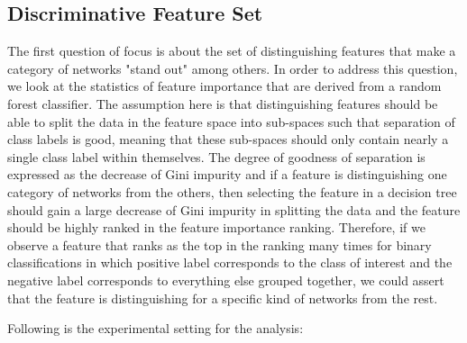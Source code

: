 \documentclass[..]{revtex4}
\begin{document}
\subsection{Discriminative Feature Set}
The first question of focus is about the set of distinguishing features that make a category of networks "stand out" among others. In order to address this question, we look at the 
 statistics of feature importance that are derived from a random forest classifier. The assumption here is that distinguishing features should be able to split the data in the feature space into sub-spaces such that separation of class labels is good, meaning that these sub-spaces should only contain nearly a single class label within themselves. The degree of goodness of separation is expressed as the decrease of Gini impurity and if a feature is distinguishing one category of networks from the others, then selecting the feature in a decision tree should gain a large decrease of Gini impurity in splitting the data and the feature should be highly ranked in the feature importance ranking. Therefore, if we observe a feature that ranks as the top in the ranking many times for binary classifications in which positive label corresponds to the class of interest and the negative label corresponds to everything else grouped together, we could assert that the feature is distinguishing for a specific kind of networks from the rest. 
 
 Following is the experimental setting for the analysis: 
\end{document}
